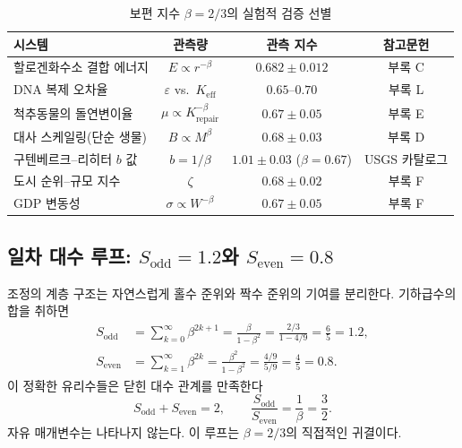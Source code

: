 \documentclass[12pt,a4paper]{article}
\begin{document}
	\begin{table}[htbp]
		\centering
		\caption{보편 지수 \(\beta = 2/3\)의 실험적 검증 선별}
		\label{tab:beta-evidence}
		\small
		\begin{tabular}{l c c c}
			\toprule
			시스템 & 관측량 & 관측 지수 & 참고문헌 \\
			\midrule
			할로겐화수소 결합 에너지 & \(E \propto r^{-\beta}\) & \(0.682 \pm 0.012\) & 부록 C \\
			DNA 복제 오차율 & \(\varepsilon\) vs.\ \(K_{\mathrm{eff}}\) & \(0.65\text{--}0.70\) & 부록 L \\
			척추동물의 돌연변이율 & \(\mu \propto K_{\mathrm{repair}}^{-\beta}\) & \(0.67 \pm 0.05\) & 부록 E \\
			대사 스케일링(단순 생물) & \(B \propto M^{\beta}\) & \(0.68 \pm 0.03\) & 부록 D \\
			구텐베르크–리히터 \(b\) 값 & \(b = 1/\beta\) & \(1.01 \pm 0.03\) (\(\beta=0.67\)) & USGS 카탈로그 \\
			도시 순위–규모 지수 & \(\zeta\) & \(0.68 \pm 0.02\) & 부록 F \\
			GDP 변동성 & \(\sigma \propto W^{-\beta}\) & \(0.67 \pm 0.05\) & 부록 F \\
			\bottomrule
		\end{tabular}
	\end{table}
	
	\subsection{일차 대수 루프: \(S_{\mathrm{odd}} = 1.2\)와 \(S_{\mathrm{even}} = 0.8\)}
	\label{sec:algebraic-loop}
	
	조정의 계층 구조는 자연스럽게 홀수 준위와 짝수 준위의 기여를 분리한다. 기하급수의 합을 취하면
	\begin{align}
		S_{\mathrm{odd}} &= \sum_{k=0}^{\infty} \beta^{2k+1} = \frac{\beta}{1-\beta^{2}} = \frac{2/3}{1 - 4/9} = \frac{6}{5} = 1.2, \label{eq:sodd}\\
		S_{\mathrm{even}} &= \sum_{k=1}^{\infty} \beta^{2k} = \frac{\beta^{2}}{1-\beta^{2}} = \frac{4/9}{5/9} = \frac{4}{5} = 0.8. \label{eq:seven}
	\end{align}
	이 정확한 유리수들은 닫힌 대수 관계를 만족한다
	\begin{equation}
		\boxed{S_{\mathrm{odd}} + S_{\mathrm{even}} = 2, \qquad \frac{S_{\mathrm{odd}}}{S_{\mathrm{even}}} = \frac{1}{\beta} = \frac{3}{2}}.
		\label{eq:algebraic-loop}
	\end{equation}
	자유 매개변수는 나타나지 않는다. 이 루프는 \(\beta = 2/3\)의 직접적인 귀결이다.
	
\end{document}
